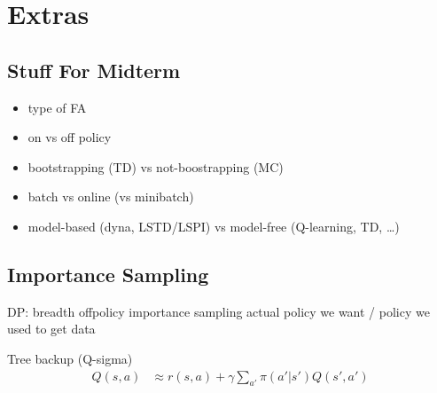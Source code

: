 \documentclass[]{article}
\theoremstyle{definition}
\begin{document}
\section{Extras}%
\label{sec:extras}

\subsection{Stuff For Midterm}%
\label{sub:stuff_for_midterm}

\begin{itemize}
    \item type of FA
    \item on vs off policy
    \item bootstrapping (TD) vs not-boostrapping (MC)
    \item batch vs online (vs minibatch)
    \item model-based (dyna, LSTD/LSPI) vs model-free (Q-learning, TD, \ldots)
\end{itemize}


\subsection{Importance Sampling}%
\label{sub:importance_sampling}

DP: breadth
offpolicy importance sampling
actual policy we want / policy we used to get data

Tree backup (Q-sigma)
\begin{align*}
    Q(s,a) &\approx r(s,a) + \gamma \sum_{a'} \pi(a'|s') Q(s',a') \\
\end{align*}
\end{document}
